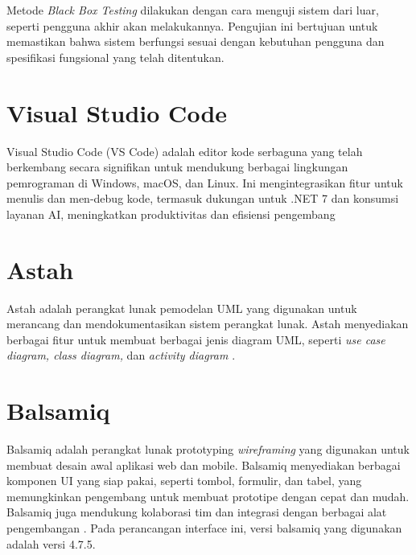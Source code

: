 Metode \textit{Black Box Testing} dilakukan dengan cara menguji sistem dari luar, seperti pengguna akhir akan melakukannya. Pengujian ini bertujuan untuk memastikan bahwa sistem berfungsi sesuai dengan kebutuhan pengguna dan spesifikasi fungsional yang telah ditentukan.

\section{Visual Studio Code}
Visual Studio Code (VS Code) adalah editor kode serbaguna yang telah berkembang secara signifikan untuk mendukung berbagai lingkungan pemrograman di Windows, macOS, dan Linux. Ini mengintegrasikan fitur untuk menulis dan men-debug kode, termasuk dukungan untuk .NET 7 dan konsumsi layanan AI, meningkatkan produktivitas dan efisiensi pengembang \cite{bree2016using}


\section{Astah}
Astah adalah perangkat lunak pemodelan UML yang digunakan untuk merancang dan mendokumentasikan sistem perangkat lunak. Astah menyediakan berbagai fitur untuk membuat berbagai jenis diagram UML, seperti \textit{use case diagram, class diagram,} dan \textit{activity diagram} \cite{hayati2021sistem}.

\section{Balsamiq}
Balsamiq adalah perangkat lunak prototyping \textit{wireframing} yang digunakan untuk membuat desain awal aplikasi web dan mobile. Balsamiq menyediakan berbagai komponen UI yang siap pakai, seperti tombol, formulir, dan tabel, yang memungkinkan pengembang untuk membuat prototipe dengan cepat dan mudah. Balsamiq juga mendukung kolaborasi tim dan integrasi dengan berbagai alat pengembangan \cite{balsamiq}. Pada perancangan interface ini, versi balsamiq yang digunakan adalah versi 4.7.5.

